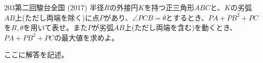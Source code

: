 \begin{thm}{203}{}{第二回駿台全国 (2017)}
 半径$R$の外接円$K$を持つ正三角形$ABC$と、$K$の劣弧$AB$上(ただし両端を除く)に点$P$があり、$\angle{PCB}=\theta$とするとき、$PA+PB^2+PC$を$R, \theta$を用いて表せ。また$P$が劣弧$AB$上(ただし両端を含む)を動くとき、$PA+PB^2+PC$の最大値を求めよ。
\end{thm}

ここに解答を記述。